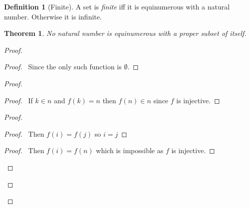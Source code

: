 \documentclass{report}
\newtheorem{theorem}[axiom]{Theorem}
\theoremstyle{definition}
\newtheorem{definition}[axiom]{Definition}
\begin{document}
    \begin{definition}[Finite]
        A set is \emph{finite} iff it is equinumerous with a natural number. Otherwise it is infinite.
    \end{definition}

    \begin{theorem}
        No natural number is equinumerous with a proper subset of itself.
    \end{theorem}

    \begin{proof}
        \pf
        \begin{proof}
            \pf\ Since the only such function is $\emptyset$.
        \end{proof}
        \begin{proof}
            \begin{proof}
                \pf\ If $k \in n$ and $f(k) = n$ then $f(n) \in n$ since $f$ is injective.
            \end{proof}
            \begin{proof}
                \begin{proof}
                    \pf\ Then $f(i) = f(j)$ so $i = j$
                \end{proof}
                \begin{proof}
                    \pf\ Then $f(i) = f(n)$ which is impossible as $f$ is injective.
                \end{proof}

\end{proof}
\end{proof}
\end{proof}
\end{document}
